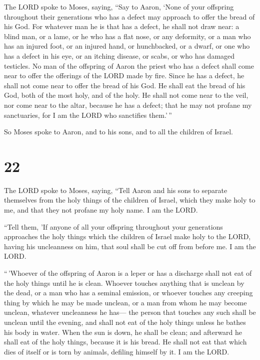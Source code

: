  The LORD spoke to Moses, saying,  ``Say
to Aaron, `None of your offspring throughout their generations who has a
defect may approach to offer the bread of his God.  For
whatever man he is that has a defect, he shall not draw near: a blind
man, or a lame, or he who has a flat nose, or any deformity,
 or a man who has an injured foot, or an injured hand,
 or hunchbacked, or a dwarf, or one who has a defect in
his eye, or an itching disease, or scabs, or who has damaged testicles.
 No man of the offspring of Aaron the priest who has a
defect shall come near to offer the offerings of the LORD made by fire.
Since he has a defect, he shall not come near to offer the bread of his
God.  He shall eat the bread of his God, both of the most
holy, and of the holy.  He shall not come near to the
veil, nor come near to the altar, because he has a defect; that he may
not profane my sanctuaries, for I am the LORD who sanctifies them.'\,''

 So Moses spoke to Aaron, and to his sons, and to all the
children of Israel.

\hypertarget{section-21}{%
\section{22}\label{section-21}}

 The LORD spoke to Moses, saying,  ``Tell
Aaron and his sons to separate themselves from the holy things of the
children of Israel, which they make holy to me, and that they not
profane my holy name. I am the LORD.

 ``Tell them, 'If anyone of all your offspring throughout
your generations approaches the holy things which the children of Israel
make holy to the LORD, having his uncleanness on him, that soul shall be
cut off from before me. I am the LORD.

 ``\,'Whoever of the offspring of Aaron is a leper or has
a discharge shall not eat of the holy things until he is clean. Whoever
touches anything that is unclean by the dead, or a man who has a seminal
emission,  or whoever touches any creeping thing by which
he may be made unclean, or a man from whom he may become unclean,
whatever uncleanness he has---  the person that touches
any such shall be unclean until the evening, and shall not eat of the
holy things unless he bathes his body in water.  When the
sun is down, he shall be clean; and afterward he shall eat of the holy
things, because it is his bread.  He shall not eat that
which dies of itself or is torn by animals, defiling himself by it. I am
the LORD.

